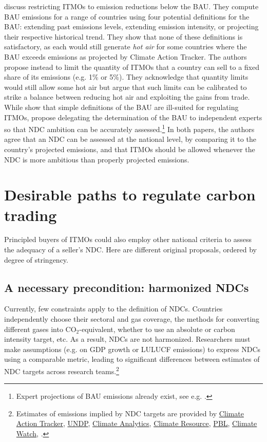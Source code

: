 ﻿\documentclass[12pt,english]{article}
\begin{document}
\cite{la_hoz_theuer_when_2019} discuss restricting ITMOs to emission reductions below the BAU. They compute BAU emissions for a range of countries using four potential definitions for the BAU: extending past emissions levels, extending emission intensity, or projecting their respective historical trend. They show that none of these definitions is satisfactory, as each would still generate \textit{hot air} for some countries where the BAU exceeds emissions as projected by Climate Action Tracker. The authors propose instead to limit the quantity of ITMOs that a country can sell to a fixed share of its emissions (e.g. 1\% or 5\%). They acknowledge that quantity limits would still allow some hot air but argue that such limits can be calibrated to strike a balance between reducing hot air and exploiting the gains from %
trade. %
While \cite{la_hoz_theuer_when_2019} show that simple definitions of the BAU are ill-suited for regulating ITMOs, \cite{michaelowa_additionality_2019} propose delegating the determination of the BAU to independent experts so that NDC ambition can be accurately assessed.\footnote{Expert projections of BAU emissions already exist, see e.g. \cite{den_elzen_are_2019,den_elzen_impact_2023,den_elzen_infographics_2024,unep_emissions_2025}.} In both papers, the authors agree that an NDC can be assessed at the national level, by comparing it to the country's projected emissions, and that ITMOs should be allowed whenever the NDC is more ambitious than properly projected emissions. 

\section{Desirable paths to regulate carbon trading\label{subsec:desirable}}

Principled %
buyers of ITMOs could also employ other national criteria to assess the adequacy of a seller's NDC. Here are different original proposals, ordered by degree of stringency.

\subsection{A necessary precondition: harmonized NDCs} %
Currently, few constraints apply to the definition of NDCs. Countries independently choose their sectoral and gas coverage, the methods for converting different gases into CO$_\text{2}$-equivalent, whether to use an absolute or carbon intensity target, etc. As a result, NDCs are not harmonized. Researchers must make assumptions (e.g. on GDP growth or LULUCF emissions) to express NDCs using a comparable metric, leading to significant differences between estimates of NDC targets across research teams.\footnote{Estimates of emissions implied by NDC targets are provided by \href{https://climateactiontracker.org/}{Climate Action Tracker}, \href{https://www.climateandforests-undp.org/plant}{UNDP}, \href{https://1p5ndc-pathways.climateanalytics.org/}{Climate Analytics}, \href{https://www.climate-resource.com/tools/ndcs}{Climate Resource}, \href{https://zenodo.org/records/10875617}{PBL}, \href{https://www.climatewatchdata.org/}{Climate Watch}, \cite{nascimento_comparing_2024,den_elzen_updated_2022,unep_emissions_2025}.} %
\end{document}
